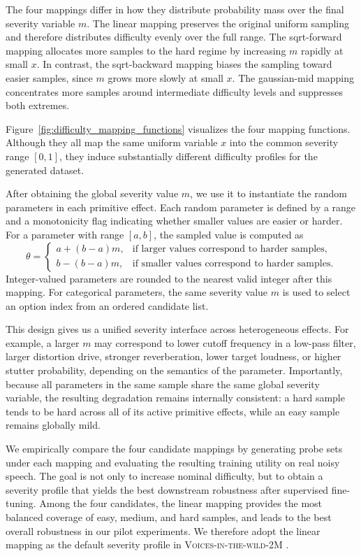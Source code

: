 \documentclass{llmxive}
\begin{document}
The four mappings differ in how they distribute probability mass over the final
severity variable $m$. The linear mapping preserves the original uniform
sampling and therefore distributes difficulty evenly over the full range. The
sqrt-forward mapping allocates more samples to the hard regime by increasing
$m$ rapidly at small $x$. In contrast, the sqrt-backward mapping biases the
sampling toward easier samples, since $m$ grows more slowly at small $x$. The
gaussian-mid mapping concentrates more samples around intermediate difficulty
levels and suppresses both extremes.

Figure~\ref{fig:difficulty_mapping_functions} visualizes the four mapping
functions. Although they all map the same uniform variable $x$ into the common
severity range $[0,1]$, they induce substantially different difficulty profiles
for the generated dataset.

After obtaining the global severity value $m$, we use it to instantiate the
random parameters in each primitive effect. Each random parameter is defined by
a range and a monotonicity flag indicating whether smaller values are easier or
harder. For a parameter with range $[a,b]$, the sampled value is computed as
\[
\theta =
\begin{cases}
a + (b-a)m, & \text{if larger values correspond to harder samples},\\[3pt]
b - (b-a)m, & \text{if smaller values correspond to harder samples}.
\end{cases}
\]
Integer-valued parameters are rounded to the nearest valid integer after this
mapping. For categorical parameters, the same severity value $m$ is used to
select an option index from an ordered candidate list.

This design gives us a unified severity interface across heterogeneous effects.
For example, a larger $m$ may correspond to lower cutoff frequency in a
low-pass filter, larger distortion drive, stronger reverberation, lower target
loudness, or higher stutter probability, depending on the semantics of the
parameter. Importantly, because all parameters in the same sample share the same
global severity variable, the resulting degradation remains internally
consistent: a hard sample tends to be hard across all of its active primitive
effects, while an easy sample remains globally mild.

We empirically compare the four candidate mappings by generating probe sets
under each mapping and evaluating the resulting training utility on real noisy
speech. The goal is not only to increase nominal difficulty, but to obtain a
severity profile that yields the best downstream robustness after supervised
fine-tuning. Among the four candidates, the linear mapping provides the most
balanced coverage of easy, medium, and hard samples, and leads to the best
overall robustness in our pilot experiments. We therefore adopt the linear
mapping as the default severity profile in  \textsc{Voices-in-the-wild-2M} .
\end{document}
